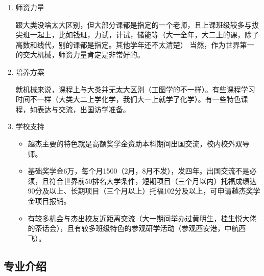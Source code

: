\documentclass[zihao=-4,fontset=none]{Beautybook-CN}
\begin{document}
\begin{enumerate}
	\item 师资力量
	      	      	          
	      跟大类没啥太大区别，但大部分课都是指定的一个老师，且上课班级较多与拔尖班一起上，比如钱班，力试，计试，储能等（大一全年，大二上的课，除了高数和线代，别的课都是指定。其他学年还不太清楚） 当然，作为世界第一的交大机械，师资力量肯定是非常好的。
	      	      	          
	\item 培养方案
	      	      	          
	      就机械来说，课程上与大类并无太大区别（工图学的不一样）。有些课程学习时间不一样（大类大二上学化学，我们大一上就学了化学）。有一些特色课程，如表达与交流，出国访学准备。
	      	      	          
	\item 学校支持
	      \begin{itemize}
	      	\item 越杰主要的特色就是高额奖学金资助本科期间出国交流，校内校外双导师。
	      	      
	      	\item 基础奖学金6万，每个月1500（2月，8月不发），发四年。出国交流不是必须，且符合世界前50排名大学条件，短期项目（三个月以内）托福成绩达90分及以上、长期项目（三个月以上）托福102分及以上，可申请越杰奖学金项目报销。
	      	      
	      	\item 有较多机会与杰出校友近距离交流（大一期间举办过黄明生，桂生悦大佬的茶话会），且有较多班级特色的参观研学活动（参观西安港，中航西飞）。
	      \end{itemize}
	      	      
\end{enumerate}

\subsection{专业介绍}
\end{document}
